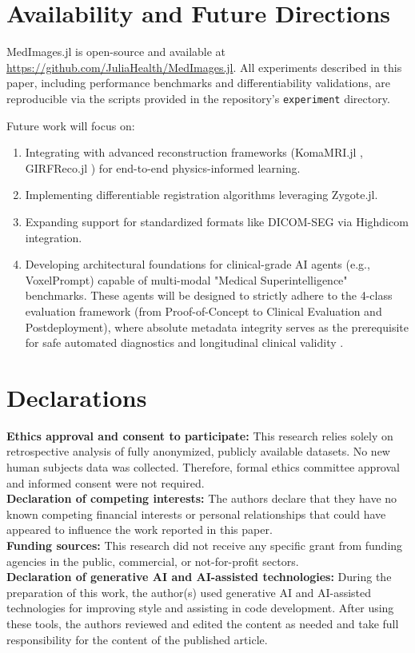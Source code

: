 \documentclass[10pt,letterpaper]{article}
\begin{document}
\section*{Availability and Future Directions}
MedImages.jl is open-source and available at \url{https://github.com/JuliaHealth/MedImages.jl}. All experiments described in this paper, including performance benchmarks and differentiability validations, are reproducible via the scripts provided in the repository's \texttt{experiment} directory.

Future work will focus on:
\begin{enumerate}
    \item Integrating with advanced reconstruction frameworks (KomaMRI.jl \cite{CastilloPassiCoronado2023}, GIRFReco.jl \cite{JaffrayWu2024}) for end-to-end physics-informed learning.
    \item Implementing differentiable registration algorithms leveraging Zygote.jl.
    \item Expanding support for standardized formats like DICOM-SEG via Highdicom \cite{BridgeGorman2022} integration.
    \item Developing architectural foundations for clinical-grade AI agents (e.g., VoxelPrompt) capable of multi-modal "Medical Superintelligence" benchmarks. These agents will be designed to strictly adhere to the 4-class evaluation framework (from Proof-of-Concept to Clinical Evaluation and Postdeployment), where absolute metadata integrity serves as the prerequisite for safe automated diagnostics and longitudinal clinical validity \cite{JhaBradshaw2022}.
\end{enumerate}

\section*{Declarations}
\textbf{Ethics approval and consent to participate:} This research relies solely on retrospective analysis of fully anonymized, publicly available datasets. No new human subjects data was collected. Therefore, formal ethics committee approval and informed consent were not required. \\
\textbf{Declaration of competing interests:} The authors declare that they have no known competing financial interests or personal relationships that could have appeared to influence the work reported in this paper. \\
\textbf{Funding sources:} This research did not receive any specific grant from funding agencies in the public, commercial, or not-for-profit sectors. \\
\textbf{Declaration of generative AI and AI-assisted technologies:} During the preparation of this work, the author(s) used generative AI and AI-assisted technologies for improving style and assisting in code development. After using these tools, the authors reviewed and edited the content as needed and take full responsibility for the content of the published article.



\end{document}
